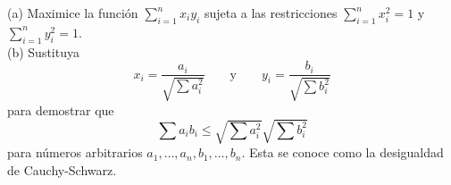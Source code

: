 \item (a) Maximice la función $\sum_{i=1}^n x_i y_i$ sujeta a las restricciones $\sum_{i=1}^n x_i^2 = 1$ y $\sum_{i=1}^n y_i^2 = 1$. \\
(b) Sustituya
\[ x_i = \frac{a_i}{\sqrt{\sum a_i^2}} \qquad \text{y} \qquad y_i = \frac{b_i}{\sqrt{\sum b_i^2}} \]
para demostrar que
\[ \sum a_i b_i \le \sqrt{\sum a_i^2} \sqrt{\sum b_i^2} \]
para números arbitrarios $a_1, \dots, a_n, b_1, \dots, b_n$. Esta se conoce como la desigualdad de Cauchy-Schwarz.
